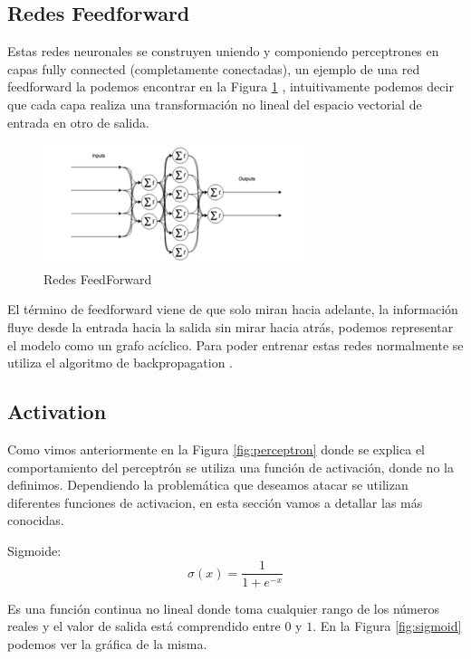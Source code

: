 \subsection{Redes Feedforward}
Estas redes neuronales se construyen uniendo y componiendo perceptrones en capas fully connected (completamente conectadas), un ejemplo de una red feedforward la podemos encontrar en la Figura \ref{fig:feedforward} , intuitivamente podemos decir que cada capa realiza una transformación no lineal del espacio vectorial de entrada en otro de salida.

\begin{figure}
\begin{center}
    \includegraphics[width=\textwidth]{images/image210.png}
    \caption{Redes FeedForward}
    \label{fig:feedforward}
\end{center}
\end{figure}

El término de feedforward viene de que solo miran hacia adelante, la información fluye desde la entrada hacia la salida sin mirar hacia atrás, podemos representar el modelo como un grafo acíclico. Para poder entrenar estas redes normalmente se utiliza el algoritmo de backpropagation \cite{kelley1960gradient}.

\subsection{Activation}
Como vimos anteriormente en la Figura \ref{fig:perceptron} donde se explica el comportamiento del perceptrón se utiliza una función de activación, donde no la definimos. Dependiendo la problemática que deseamos atacar se utilizan diferentes funciones de activacion, en esta sección vamos a detallar las más conocidas.

Sigmoide:  \[ \sigma(x) = \frac{1}{1 + e^{-x}}\]

Es una función continua no lineal donde toma cualquier rango de los números reales y el valor de salida está comprendido entre $0$ y $1$. En la Figura \ref{fig:sigmoid} podemos ver la gráfica de la misma.

